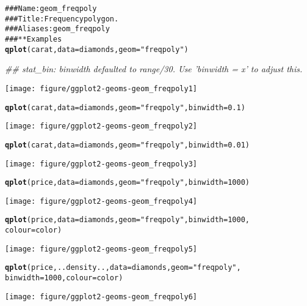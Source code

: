 \documentclass[a4paper,titlepage]{tufte-handout}\usepackage{graphicx, color}
\makeatletter
\def\maxwidth{ %
  \ifdim\Gin@nat@width>\linewidth
    \linewidth
  \else
    \Gin@nat@width
  \fi
}
\newcommand{\hlfunctioncall}[1]{\textcolor[rgb]{0.501960784313725,0,0.329411764705882}{\textbf{#1}}}%
\newcommand{\hlstring}[1]{\textcolor[rgb]{0.6,0.6,1}{#1}}%
\newcommand{\hlcomment}[1]{\textcolor[rgb]{0.180392156862745,0.6,0.341176470588235}{#1}}%
\newenvironment{kframe}{%
 \def\at@end@of@kframe{}%
 \ifinner\ifhmode%
  \def\at@end@of@kframe{\end{minipage}}%
  \begin{minipage}{\columnwidth}%
 \fi\fi%
 \def\FrameCommand##1{\hskip\@totalleftmargin \hskip-\fboxsep
 \colorbox{shadecolor}{##1}\hskip-\fboxsep
     \hskip-\linewidth \hskip-\@totalleftmargin \hskip\columnwidth}%
 \MakeFramed {\advance\hsize-\width
   \@totalleftmargin\z@ \linewidth\hsize
   \@setminipage}}%
 {\par\unskip\endMakeFramed%
 \at@end@of@kframe}
\newenvironment{knitrout}{}{} %
\makeatother
\begin{document}
\begin{knitrout}
\color{fgcolor}\begin{kframe}
\begin{alltt}
\hlcomment{### Name: geom_freqpoly}
\hlcomment{### Title: Frequency polygon.}
\hlcomment{### Aliases: geom_freqpoly}
\hlcomment{### ** Examples}
\hlfunctioncall{qplot}(carat, data = diamonds, geom = \hlstring{"freqpoly"})
\end{alltt}


{\ttfamily\noindent\itshape\textcolor{messagecolor}{\#\# stat\_bin: binwidth defaulted to range/30. Use 'binwidth = x' to adjust this.}}\end{kframe}\texttt{[image: figure/ggplot2-geoms-geom\_freqpoly1]} \begin{kframe}\begin{alltt}
\hlfunctioncall{qplot}(carat, data = diamonds, geom = \hlstring{"freqpoly"}, binwidth = 0.1)
\end{alltt}
\end{kframe}\texttt{[image: figure/ggplot2-geoms-geom\_freqpoly2]} \begin{kframe}\begin{alltt}
\hlfunctioncall{qplot}(carat, data = diamonds, geom = \hlstring{"freqpoly"}, binwidth = 0.01)
\end{alltt}
\end{kframe}\texttt{[image: figure/ggplot2-geoms-geom\_freqpoly3]} \begin{kframe}\begin{alltt}
\hlfunctioncall{qplot}(price, data = diamonds, geom = \hlstring{"freqpoly"}, binwidth = 1000)
\end{alltt}
\end{kframe}\texttt{[image: figure/ggplot2-geoms-geom\_freqpoly4]} \begin{kframe}\begin{alltt}
\hlfunctioncall{qplot}(price, data = diamonds, geom = \hlstring{"freqpoly"}, binwidth = 1000,
  colour = color)
\end{alltt}
\end{kframe}\texttt{[image: figure/ggplot2-geoms-geom\_freqpoly5]} \begin{kframe}\begin{alltt}
\hlfunctioncall{qplot}(price, ..density.., data = diamonds, geom = \hlstring{"freqpoly"},
  binwidth = 1000, colour = color)
\end{alltt}
\end{kframe}\texttt{[image: figure/ggplot2-geoms-geom\_freqpoly6]} 
\end{knitrout}
\end{document}
